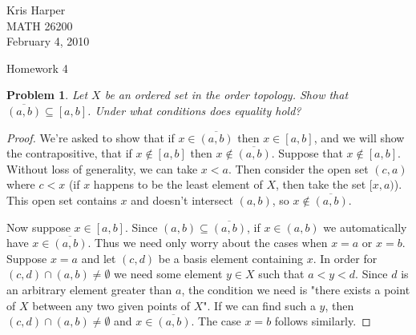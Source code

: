 \documentclass{article}
\newtheorem{problem}{Problem}
\begin{document}
\begin{flushright}
Kris Harper\\

MATH 26200\\

February 4, 2010
\end{flushright}

\begin{center}
Homework 4
\end{center}

\begin{problem}
Let $X$ be an ordered set in the order topology. Show that $\overline{(a,b)} \subseteq [a,b]$. Under what conditions does equality hold?
\end{problem}
\begin{proof}
We're asked to show that if $x \in \overline{(a,b)}$ then $x \in [a,b]$, and we will show the contrapositive, that if $x \notin [a,b]$ then $x \notin \overline{(a,b)}$. Suppose that $x \notin [a,b]$. Without loss of generality, we can take $x < a$. Then consider the open set $(c,a)$ where $c < x$ (if $x$ happens to be the least element of $X$, then take the set $[x,a)$). This open set contains $x$ and doesn't intersect $(a,b)$, so $x \notin \overline{(a,b)}$.

Now suppose $x \in [a,b]$. Since $(a,b) \subseteq \overline{(a,b)}$, if $x \in (a,b)$ we automatically have $x \in \overline{(a,b)}$. Thus we need only worry about the cases when $x=a$ or $x=b$. Suppose $x=a$ and let $(c,d)$ be a basis element containing $x$. In order for $(c,d) \cap (a,b) \neq \emptyset$ we need some element $y \in X$ such that $a < y < d$. Since $d$ is an arbitrary element greater than $a$, the condition we need is "there exists a point of $X$ between any two given points of $X$". If we can find such a $y$, then $(c,d) \cap (a,b) \neq \emptyset$ and $x \in \overline{(a,b)}$. The case $x=b$ follows similarly.
\end{proof}
\end{document}
